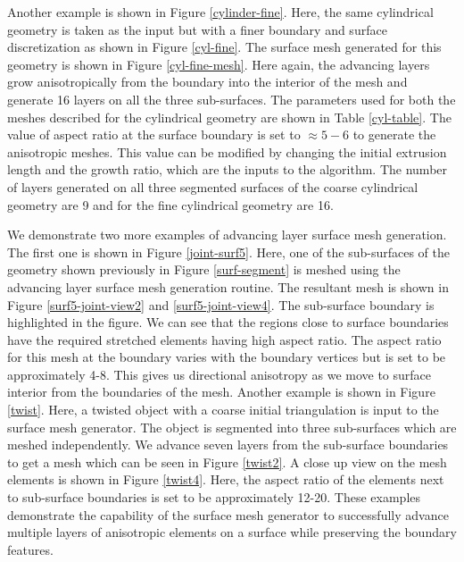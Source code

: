 \documentclass[conf]{new-aiaa}
\begin{document}
Another example is shown in Figure \ref{cylinder-fine}. Here, the same cylindrical geometry is taken as the input but with a finer boundary and surface discretization as shown in Figure \ref{cyl-fine}. The surface mesh generated for this geometry is shown in Figure \ref{cyl-fine-mesh}. Here again, the advancing layers grow anisotropically from the boundary into the interior of the mesh and generate 16 layers on all the three sub-surfaces. The parameters used for both the meshes described for the cylindrical geometry are shown in Table \ref{cyl-table}. The value of aspect ratio at the surface boundary is set to $\approx 5-6$ to generate the anisotropic meshes. This value can be modified by changing the initial extrusion length and the growth ratio, which are the inputs to the algorithm. The number of layers generated on all three segmented surfaces of the coarse cylindrical geometry are 9 and for the fine cylindrical geometry are 16.

We demonstrate two more examples of advancing layer surface mesh generation. The first one is shown in Figure \ref{joint-surf5}. Here, one of the sub-surfaces of the geometry shown previously in Figure \ref{surf-segment} is meshed using the advancing layer surface mesh generation routine. The resultant mesh is shown in Figure \ref{surf5-joint-view2} and \ref{surf5-joint-view4}. The sub-surface boundary is highlighted in the figure. We can see that the regions close to surface boundaries have the required stretched elements having high aspect ratio. The aspect ratio for this mesh at the boundary varies with the boundary vertices but is set to be approximately 4-8. This gives us directional anisotropy as we move to surface interior from the boundaries of the mesh. Another example is shown in Figure \ref{twist}. Here, a twisted object with a coarse initial triangulation is input to the surface mesh generator. The object is segmented into three sub-surfaces which are meshed independently. We advance seven layers from the sub-surface boundaries to get a mesh which can be seen in Figure \ref{twist2}. A close up view on the mesh elements is shown in Figure \ref{twist4}. Here, the aspect ratio of the elements next to sub-surface boundaries is set to be approximately 12-20. These examples demonstrate the capability of the surface mesh generator to successfully advance multiple layers of anisotropic elements on a surface while preserving the boundary features.
\end{document}
